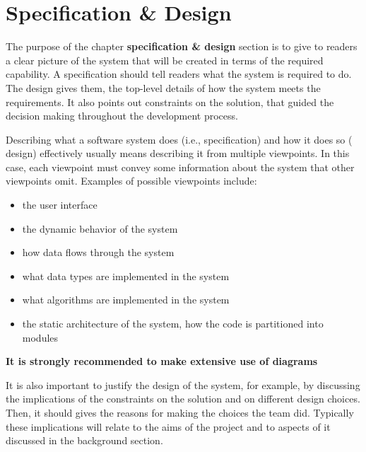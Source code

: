 
\chapter{Specification \& Design}\label{ch:specification-design}

The purpose of the chapter \textbf{specification \& design} section is to give to readers a clear picture of the system that will be created in terms of the required capability. A specification should tell readers what the system is required to do. The design gives them, the top-level details of how the system meets the requirements. It also points out constraints on the solution, that guided the decision making throughout the development process.

Describing what a software system does (i.e., specification) and how it does so (\ie{} design) effectively usually means describing it from multiple viewpoints. In this case, each viewpoint must convey some information about the system that other viewpoints omit. Examples of possible viewpoints include:

\begin{itemize}
  	\item the user interface
	\item the dynamic behavior of the system
	\item how data flows through the system
	\item what data types are implemented in the system
	\item what algorithms are implemented in the system
	\item the static architecture of the system, \ie{} how the code is partitioned into modules
\end{itemize}

\textbf{It is strongly recommended to make extensive use of diagrams}

It is also important to justify the design of the system, for example, by discussing the implications of the constraints on the solution and on different design choices. Then, it should gives the reasons for making the choices the team did. Typically these implications will relate to the aims of the project and to aspects of it discussed in the background section.